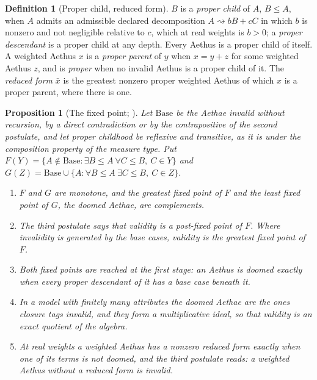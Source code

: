 \documentclass[11pt]{article}
\newtheorem{proposition}{Proposition}
\theoremstyle{definition}
\newtheorem{definition}{Definition}
\newcommand{\Aethus}{Aethus}
\begin{document}
\begin{definition}[Proper child, reduced form]\label{def:core_proper}
$B$ is a \emph{proper child} of $A$, $B \le A$, when $A$ admits an admissible declared decomposition $A \rightsquigarrow bB + cC$ in which $b$ is nonzero and not negligible relative to $c$, which at real weights is $b > 0$; a \emph{proper descendant} is a proper child at any depth. Every \Aethus{} is a proper child of itself. A weighted \Aethus{} $x$ is a \emph{proper parent} of $y$ when $x = y + z$ for some weighted \Aethus{} $z$, and is \emph{proper} when no invalid \Aethus{} is a proper child of it. The \emph{reduced form} $\bar{x}$ is the greatest nonzero proper weighted \Aethus{} of which $x$ is a proper parent, where there is one.
\end{definition}

\begin{proposition}[The fixed point; \cite{AethusTree, Aethus}]\label{prop:core_fixed}
Let $\mathrm{Base}$ be the Aethae invalid without recursion, by a direct contradiction or by the contrapositive of the second postulate, and let proper childhood be reflexive and transitive, as it is under the composition property of the measure type. Put $F(Y) = \{A \notin \mathrm{Base} : \exists B \le A\ \forall C \le B,\ C \in Y\}$ and $G(Z) = \mathrm{Base} \cup \{A : \forall B \le A\ \exists C \le B,\ C \in Z\}$.
\begin{enumerate}
\item[(i)] $F$ and $G$ are monotone, and the greatest fixed point of $F$ and the least fixed point of $G$, the \emph{doomed} Aethae, are complements.
\item[(ii)] The third postulate says that validity is a post-fixed point of $F$. Where invalidity is generated by the base cases, validity is the greatest fixed point of $F$.
\item[(iii)] Both fixed points are reached at the first stage: an \Aethus{} is doomed exactly when every proper descendant of it has a base case beneath it.
\item[(iv)] In a model with finitely many attributes the doomed Aethae are the ones closure tags invalid, and they form a multiplicative ideal, so that validity is an exact quotient of the algebra.
\item[(v)] At real weights a weighted \Aethus{} has a nonzero reduced form exactly when one of its terms is not doomed, and the third postulate reads: a weighted \Aethus{} without a reduced form is invalid.
\end{enumerate}
\end{proposition}
\end{document}
